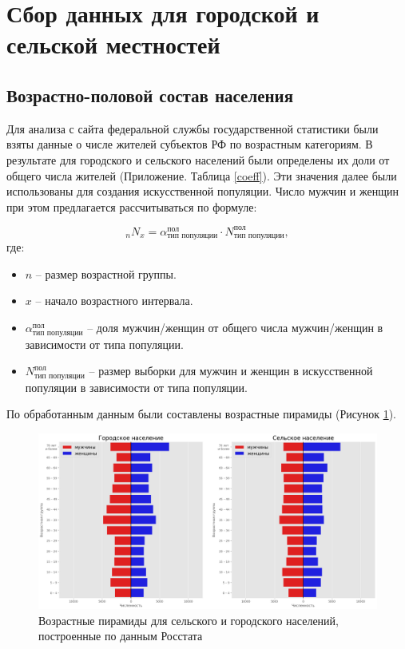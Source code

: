 \documentclass[14pt,a4paper]{article}
\begin{document}
\section{Сбор данных для городской и сельской местностей}

\subsection{Возрастно-половой состав населения}\label{1}

Для анализа с сайта федеральной службы государственной статистики \cite{rosstat} были взяты данные о числе жителей субъектов РФ по возрастным категориям. В результате для городского и сельского населений были определены их доли от общего числа жителей (Приложение. Таблица \ref{coeff}). Эти значения далее были использованы для создания искусственной популяции. Число мужчин и женщин при этом предлагается рассчитываться по формуле:

\begin{equation}
	{}_n N_x = \alpha_{\text{тип популяции}}^{\text{пол}} \cdot N_{\text{тип популяции}}^{\text{пол}}, 
\end{equation}
где:
\begin{itemize}
	
	\item $n$ -- размер возрастной группы.
	
	\item $x$ -- начало возрастного интервала.
	
	\item $\alpha_{\text{тип популяции}}^{\text{пол}}$ -- доля мужчин/женщин от общего числа мужчин/женщин в зависимости от типа популяции. 
	
	\item $ N_{\text{тип популяции}}^{\text{пол}}$ -- размер выборки для мужчин и женщин в искусственной популяции в зависимости от типа популяции.
	
	
\end{itemize}

По обработанным данным были составлены возрастные пирамиды (Рисунок \ref{fig:tree}).

\begin{figure}[h!]
	\centering
	\includegraphics[width=1\textwidth]{img/tree_theory.png}
	\caption{Возрастные пирамиды для сельского и городского населений, построенные по данным Росстата \cite{rosstat}}
	\label{fig:tree}
\end{figure} 
\end{document}
